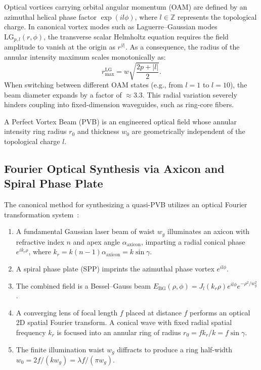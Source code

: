 \documentclass{optica-article}
\begin{document}
Optical vortices carrying orbital angular momentum (OAM) are defined by an azimuthal helical phase factor $\exp(i l \phi)$, where $l \in \mathbb{Z}$ represents the topological charge. In canonical vortex modes such as Laguerre--Gaussian modes $\text{LG}_{p, l}(r, \phi)$, the transverse scalar Helmholtz equation requires the field amplitude to vanish at the origin as $r^{|l|}$. As a consequence, the radius of the annular intensity maximum scales monotonically as:
\begin{equation}
r_{\max}^{\text{LG}} = w \sqrt{\frac{2p + |l|}{2}}.
\end{equation}
When switching between different OAM states (e.g., from $l=1$ to $l=10$), the beam diameter expands by a factor of $\approx 3.3$. This radial variation severely hinders coupling into fixed-dimension waveguides, such as ring-core fibers.

A Perfect Vortex Beam (PVB) is an engineered optical field whose annular intensity ring radius $r_0$ and thickness $w_0$ are geometrically independent of the topological charge $l$.

\subsection{Fourier Optical Synthesis via Axicon and Spiral Phase Plate}

The canonical method for synthesizing a quasi-PVB utilizes an optical Fourier transformation system~\cite{Vaity2015}:
\begin{enumerate}
    \item A fundamental Gaussian laser beam of waist $w_g$ illuminates an axicon with refractive index $n$ and apex angle $\alpha_{\text{axicon}}$, imparting a radial conical phase $e^{i k_r \rho}$, where $k_r = k (n-1) \alpha_{\text{axicon}} = k \sin \gamma$.
    \item A spiral phase plate (SPP) imprints the azimuthal phase vortex $e^{i l \phi}$.
    \item The combined field is a Bessel--Gauss beam $E_{\text{BG}}(\rho, \phi) = J_l(k_r \rho) e^{i l \phi} e^{-\rho^2 / w_g^2}$.
    \item A converging lens of focal length $f$ placed at distance $f$ performs an optical 2D spatial Fourier transform. A conical wave with fixed radial spatial frequency $k_r$ is focused into an annular ring of radius $r_0 = f k_r / k = f \sin \gamma$.
    \item The finite illumination waist $w_g$ diffracts to produce a ring half-width $w_0 = 2f / (k w_g) = \lambda f / (\pi w_g)$.
\end{enumerate}
\end{document}
